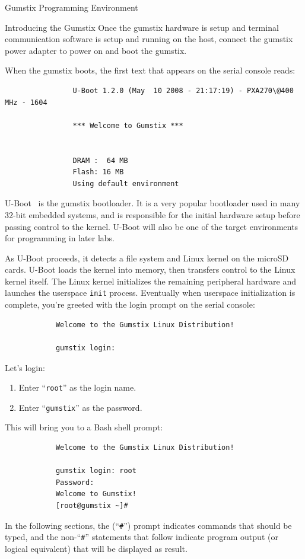 \documentclass{article}
\begin{document}
\begin{section}{Gumstix Programming Environment} \label{linux}
		\begin{subsection}{Introducing the Gumstix}
			Once the gumstix hardware is setup and terminal communication software is
			setup and running on the host, connect the gumstix power adapter to power
			on and boot the gumstix.

			When the gumstix boots, the first text that appears on the serial console
			reads:
			\begin{verbatim}
				U-Boot 1.2.0 (May  10 2008 - 21:17:19) - PXA270\@400 MHz - 1604

				*** Welcome to Gumstix ***

			
				DRAM :  64 MB
				Flash: 16 MB
				Using default environment

			\end{verbatim}
			U-Boot~\cite{DENX:U-Boot} is the gumstix bootloader.  It is a very popular
			bootloader used in many 32-bit embedded systems, and is responsible for the
			initial hardware setup before passing control to the kernel.  U-Boot will
			also be one of the target environments for programming in later labs.

			As U-Boot proceeds, it detects a file system and Linux kernel on the microSD cards.
			U-Boot loads the kernel into memory, then transfers control to the Linux
			kernel itself.  The Linux kernel initializes the remaining peripheral
			hardware and launches the userspace \texttt{init} process.  Eventually when
			userspace initialization is complete, you're greeted with the login prompt
			on the serial console:
			\begin{verbatim}
			Welcome to the Gumstix Linux Distribution!

			gumstix login:
			\end{verbatim}
			Let's login:
			\begin{enumerate}
				\item Enter ``\texttt{root}'' as the login name.
				\item Enter ``\texttt{gumstix}'' as the password.
			\end{enumerate}
			This will bring you to a Bash shell prompt:
			\begin{verbatim}
			Welcome to the Gumstix Linux Distribution!

			gumstix login: root
			Password:
			Welcome to Gumstix!
			[root@gumstix ~]#
			\end{verbatim}
			In the following sections, the (``\verb|#|'') prompt indicates commands
			that should be typed, and the non-``\verb|#|'' statements that follow
			indicate program output (or logical equivalent) that will be displayed as
			result.
		\end{subsection}


\end{section}
\end{document}
